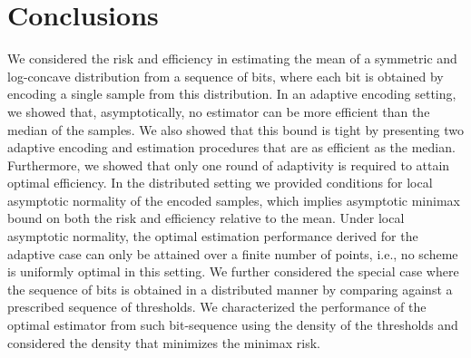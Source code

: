 \section{Conclusions \label{sec:conclusions}}
We considered the risk and efficiency in estimating the mean of a symmetric and log-concave distribution from a sequence of bits, where each bit is obtained by encoding a single sample from this distribution. 
%
In an adaptive encoding setting, we showed that, asymptotically, no estimator can be more efficient than the median of the samples. We also showed that this bound is tight by presenting two adaptive encoding and estimation procedures that are as efficient as the median. Furthermore, we showed that only one round of adaptivity is required to attain optimal efficiency. In the distributed setting we provided conditions for local asymptotic normality of the encoded samples, which implies asymptotic minimax bound on both the risk and efficiency relative to the mean. 
%
Under local asymptotic normality, the optimal estimation performance derived for the adaptive case can only be attained over a finite number of points, i.e., no scheme is uniformly optimal in this setting. 
%
We further considered the special case where the sequence of bits is obtained in a distributed manner by comparing against a prescribed sequence of thresholds. We characterized the performance of the optimal estimator from such bit-sequence using the density of the thresholds and considered the density that minimizes the minimax risk. 
%

